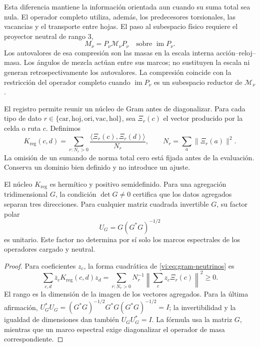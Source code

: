 Esta diferencia mantiene la información orientada aun cuando su suma
total sea nula. El operador completo utiliza, además, los predecesores
torsionales, las vacancias y el transporte entre hojas. El paso al
subespacio físico requiere el proyector neutral de rango \(3\),
\[
 M_\nu=P_\nu\mathcal M_\nu P_\nu
 \quad\text{sobre }\operatorname{im}P_\nu.
\]
Los autovalores de esa compresión son las masas en la escala interna
acción--reloj--masa. Los ángulos de mezcla actúan entre sus marcos;
no sustituyen la escala ni generan retrospectivamente los autovalores.
La compresión coincide con la restricción del operador completo cuando
\(\operatorname{im}P_\nu\) es un subespacio reductor de
\(\mathcal M_\nu\).

El registro permite reunir un núcleo de Gram antes de diagonalizar.
Para cada tipo de dato
\(r\in\{\mathrm{car},\mathrm{hoj},\mathrm{ori},\mathrm{vac},\mathrm{hol}\}\),
sea \(\Xi_r(c)\) el vector producido por la celda o ruta \(c\).
Definimos
\begin{equation}
 K_{\mathrm{reg}}(c,d)=
 \sum_{r:N_r>0}\frac{\langle\Xi_r(c),\Xi_r(d)\rangle}{N_r},
 \qquad N_r=\sum_a\|\Xi_r(a)\|^2.
 \label{vi:eq:gram-neutrinos}
\end{equation}
La omisión de un sumando de norma total cero está fijada antes de la
evaluación. Conserva un dominio bien definido y no introduce un ajuste.

\begin{proposition}
\label{vi:prop:gram-neutrinos}
El núcleo \(K_{\mathrm{reg}}\) es hermítico y positivo semidefinido.
Para una agregación tridimensional \(G\), la condición \(\det G\ne0\)
certifica que los datos agregados separan tres direcciones. Para cualquier
matriz cuadrada invertible \(G\), su factor polar
\[
 U_G=G(G^*G)^{-1/2}
\]
es unitario. Este factor no determina por sí solo los marcos espectrales
de los operadores cargado y neutral.
\end{proposition}
\begin{proof}
Para coeficientes \(z_c\), la forma cuadrática de
\eqref{vi:eq:gram-neutrinos} es
\[
 \sum_{c,d}\overline z_cK_{\mathrm{reg}}(c,d)z_d
 =\sum_{r:N_r>0}N_r^{-1}
 \left\|\sum_c z_c\Xi_r(c)\right\|^2\ge0.
\]
El rango es la dimensión de la imagen de los vectores agregados. Para la
última afirmación,
\(U_G^*U_G=(G^*G)^{-1/2}G^*G(G^*G)^{-1/2}=I\);
la invertibilidad y la igualdad de dimensiones dan también \(U_GU_G^*=I\).
La fórmula usa la matriz \(G\), mientras que un marco espectral exige
diagonalizar el operador de masa correspondiente.
\end{proof}


